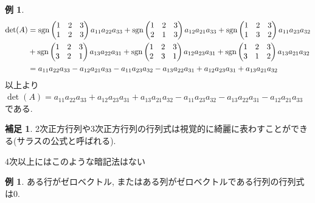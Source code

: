 \documentclass[dvipdfmx,a4paper,11pt]{article} %
\newcommand{\sgn}{{\rm sgn}}
\theoremstyle{definition}
\newtheorem{exa}[thm]{例}
\newtheorem{rema}[thm]{補足}
\begin{document}
\begin{exa}
  \begin{align*}
  \det(A) 
  &= 
  \sgn \begin{pmatrix}
1& 2 &3\\
1& 2 &3\\
 \end{pmatrix}
 a_{11}a_{22}a_{33}
 +
   \sgn \begin{pmatrix}
1& 2 &3\\
2& 1 &3\\
 \end{pmatrix} 
 a_{12}a_{21}a_{33}
 +
\sgn \begin{pmatrix}
1& 2 &3\\
1& 3 &2\\
 \end{pmatrix} 
 a_{11}a_{23}a_{32} 
  \\%
  &+
\sgn  \begin{pmatrix}
1& 2 &3\\
3& 2 &1\\
 \end{pmatrix}
 a_{13}a_{22}a_{31} 
 +
\sgn  \begin{pmatrix}
1& 2 &3\\
2& 3 &1\\
 \end{pmatrix}
 a_{12}a_{23}a_{31} 
  +
\sgn   \begin{pmatrix}
1& 2 &3\\
3& 1 &2\\
 \end{pmatrix}
 a_{13}a_{21}a_{32} 
 \\%
   &= a_{11}a_{22}a_{33}- a_{12}a_{21}a_{33}- a_{11}a_{23}a_{32} 
   - a_{13}a_{22}a_{31}  + a_{12}a_{23}a_{31}  +  a_{13}a_{21}a_{32} 
  \end{align*}
  以上より
  $
 \det(A)= 
 a_{11}a_{22}a_{33}+ a_{12}a_{23}a_{31}  +  a_{13}a_{21}a_{32} 
- a_{11}a_{23}a_{32}     - a_{13}a_{22}a_{31}  - a_{12}a_{21}a_{33}
  $
  である.
\end{exa}
\begin{rema}
2次正方行列や3次正方行列の行列式は視覚的に綺麗に表わすことができる(サラスの公式と呼ばれる).

4次以上にはこのような暗記法はない
\end{rema}

\begin{exa}\cite[例 3.1.12]{O}
ある行がゼロベクトル, またはある列がゼロベクトルである行列の行列式は0.
\end{exa}
\end{document}
